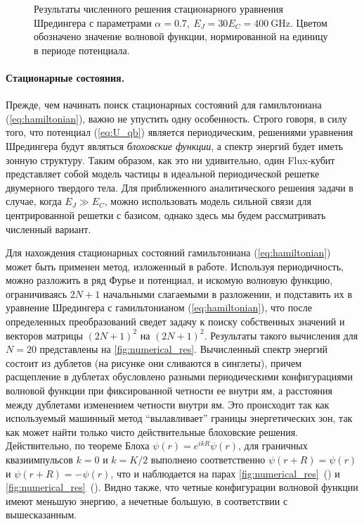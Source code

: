 \documentclass[12pt]{article}
\numberwithin{equation}{section}
\begin{document}
\begin{figure}[!p]
\endgroup
\caption{Результаты численного решения стационарного уравнения Шредингера с параметрами $\alpha=0.7,\ E_J  = 30E_C = 400\ \text{GHz}$. Цветом обозначено значение волновой функции, нормированной на единицу в периоде потенциала.}
\label{fig:numerical_res}
\end{figure} 

\paragraph{Стационарные состояния.} Прежде, чем начинать поиск стационарных состояний для гамильтониана (\ref{eq:hamiltonian}), важно не упустить одну особенность. Строго говоря, в силу того, что потенциал (\ref{eq:U_qb}) является периодическим, решениями уравнения Шредингера будут являться \textit{блоховские функции}, а спектр энергий будет иметь зонную структуру. Таким образом, как это ни удивительно, один Flux-кубит представляет собой модель частицы в идеальной периодической решетке двумерного твердого тела. Для приближенного аналитического решения задачи в случае, когда $E_J \gg E_C$, можно использовать модель сильной связи для центрированной решетки с базисом, однако здесь мы будем рассматривать численный вариант. 

Для нахождения стационарных состояний гамильтониана (\ref{eq:hamiltonian}) может быть применен метод, изложенный в работе\cite{Johansson}. Используя периодичность, можно разложить в ряд Фурье и потенциал, и искомую волновую функцию, ограничиваясь $2N+1$ начальными слагаемыми в разложении, и подставить их в уравнение Шредингера с гамильтонианом (\ref{eq:hamiltonian}), что после определенных преобразований сведет задачу к поиску собственных значений и векторов матрицы $(2N+1)^2$ на $(2N+1)^2$. Результаты такого вычисления для $N=20$ представлены на \autoref{fig:numerical_res}. Вычисленный спектр энергий состоит из дублетов (на рисунке они сливаются в синглеты), причем расщепление в дублетах обусловлено разными периодическими конфигурациями волновой функции при фиксированной четности ее внутри ям, а расстояния между дублетами изменением четности внутри ям. Это происходит так как используемый машинный метод ``вылавливает'' границы энергетических зон, так как может найти только чисто действительные блоховские решения. Действительно, по теореме Блоха $\psi(r) = e^{ikR}\psi(r)$, для граничных квазиимпульсов $k = 0$  и $k = K/2$ выполнено соответственно $\psi(r+R) = \psi(r)$ и $\psi(r+R)=-\psi(r)$, что и наблюдается на парах \autoref{fig:numerical_res}~() и \autoref{fig:numerical_res}~(). 
Видно также, что четные конфигурации волновой функции имеют меньшую энергию, а нечетные большую, в соответствии с вышесказанным.
\end{document}
